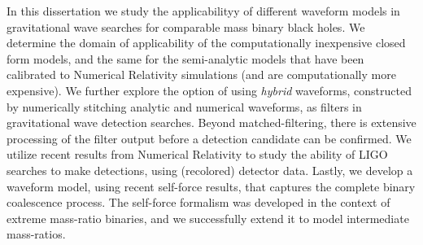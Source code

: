 
In this dissertation we study the applicabilityy of different waveform models 
in gravitational wave searches for comparable mass binary black holes.
We determine the domain of applicability of the computationally inexpensive closed 
form models, and the same for the semi-analytic models that have been calibrated
to Numerical Relativity simulations (and are computationally more expensive).
We further explore the option of using {\it hybrid} waveforms, constructed 
by numerically stitching analytic and numerical waveforms, as filters in
gravitational wave detection searches. Beyond matched-filtering, there 
is extensive processing of the filter output before a detection candidate can
be confirmed. We utilize recent results from Numerical Relativity to study
the ability of LIGO searches to make detections, using (recolored) detector data.
Lastly, we develop a waveform model, using recent self-force results, that 
captures the complete binary coalescence process. The self-force formalism was
developed in the context of extreme mass-ratio binaries, and we successfully
extend it to model intermediate mass-ratios.

